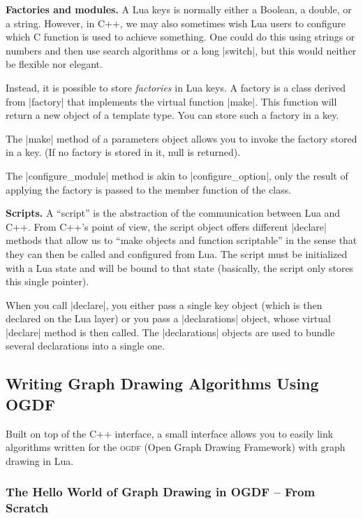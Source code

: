 \medskip
\noindent\textbf{Factories and modules.}
A Lua keys is normally either a Boolean, a double, or a
string. However, in C++, we may also sometimes wish Lua users to
configure which C function is used to achieve something. One could do
this using strings or numbers and then use search algorithms or a long
|switch|, but this would neither be flexible nor elegant.

Instead, it is possible to store \emph{factories} in Lua keys. A
factory is a class derived from |factory| that implements the virtual
function |make|. This function will return a new object of a template
type. You can store such a factory in a key.

The |make| method of a parameters object allows you to invoke the
factory stored in a key. (If no factory is stored in it, null is
returned). 

The |configure_module| method is akin to |configure_option|, only 
the result of applying the factory is passed to the member function of
the class.



\medskip
\noindent\textbf{Scripts.}
A ``script'' is the abstraction of the communication between Lua and
C++. From C++'s point of view, the script object offers different
|declare| methods that allow us to ``make objects and function
scriptable'' in the sense that they can then be called and configured
from Lua. The script must be initialized with a Lua state and will be
bound to that state (basically, the script only stores this single
pointer).

When you call |declare|, you either pass a single key object (which is
then declared on the Lua layer) or you pass a |declarations| object,
whose virtual |declare| method is then called. The |declarations|
objects are used to bundle several declarations into a single one.



\subsection{Writing Graph Drawing Algorithms Using OGDF}

\label{section-gd-ogdf-interface}

Built on top of the C++ interface, a small interface allows you to
easily link algorithms written for the \textsc{ogdf} (Open Graph
Drawing Framework) with graph drawing in Lua. 


\subsubsection{The Hello World of Graph Drawing in OGDF -- From Scratch}

